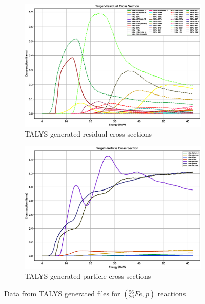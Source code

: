 \begin{figure}[htb]
\centering
\begin{subfigure}{0.9\textwidth}
  \includegraphics[width=\linewidth]{chapters/activity_code/tendl-fe56/rxs_p_26056_all.eps}
  \caption{TALYS generated residual cross sections}
  \label{fig:xsdata-residual}
\end{subfigure}
\begin{subfigure}{0.9\textwidth}
  \includegraphics[width=\linewidth]{chapters/activity_code/tendl-fe56/pxs_p_26056_all.eps}
  \caption{TALYS generated particle cross sections}
  \label{fig:activity-v2-residual-6}
\end{subfigure}
\caption{Data from TALYS generated files for $({}^{56}_{26}Fe, p)$ reactions}
\label{fig:xsdata-particle2}
\end{figure}

